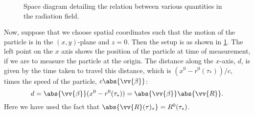 \documentclass[fleqn]{NotesClass}
\begin{document}
    \begin{figure}
        \caption{Space diagram detailing the relation between various quantities in the radiation field.}
        \label{fig:space radiation field quantities}
    \end{figure}
    
    Now, suppose that we choose spatial coordinates such that the motion of the particle is in the \((x, y)\)-plane and \(z = 0\).
    Then the setup is as shown in \cref{fig:space radiation field quantities}.
    The left point on the \(x\) axis shows the position of the particle at time of measurement, if we are to measure the particle at the origin.
    The distance along the \(x\)-axis, \(d\), is given by the time taken to travel this distance, which is \((x^0 - r^0(\tau_*))/c\), times the speed of the particle, \(c\abs{\vv{\beta}}\):
    \begin{equation}
        d = \abs{\vv{\beta}}(x^0 - r^0(\tau_*)) = \abs{\vv{\beta}}\abs{\vv{R}}.
    \end{equation}
    Here we have used the fact that \(\abs{\vv{R}(\tau)_*} = R^0(\tau_*)\).
    
\end{document}
